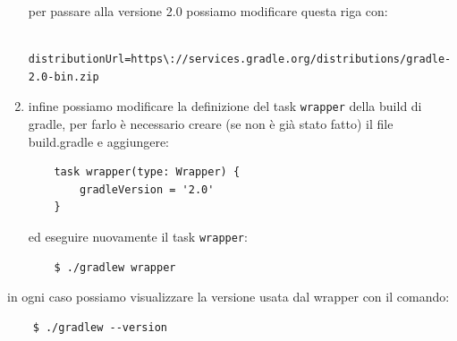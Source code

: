 \documentclass{article}
\begin{document}
\begin{flushleft}
\begin{enumerate}
    per passare alla versione 2.0 possiamo modificare questa riga con:
\begin{verbatim}
    distributionUrl=https\://services.gradle.org/distributions/gradle-2.0-bin.zip \end{verbatim}
    \item infine possiamo modificare la definizione del task \texttt{wrapper} della build di gradle, per farlo è necessario creare (se non è già stato fatto) il file build.gradle e aggiungere:
\begin{verbatim}
    task wrapper(type: Wrapper) {
        gradleVersion = '2.0'
    } \end{verbatim}
    ed eseguire nuovamente il task \texttt{wrapper}:
\begin{verbatim}
    $ ./gradlew wrapper \end{verbatim}
\end{enumerate}
in ogni caso possiamo visualizzare la versione usata dal wrapper con il comando:
\begin{verbatim}
    $ ./gradlew --version \end{verbatim}

\end{flushleft}
\end{document}
